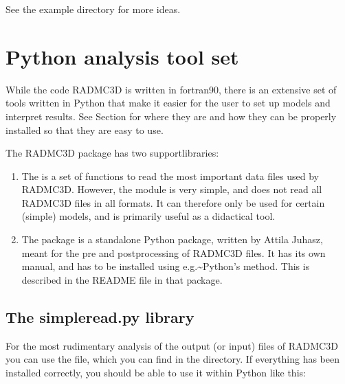 \documentclass[letterpaper,10pt,english]{sphinxmanual}
\begin{document}
See the example directory  for
more ideas.


\chapter{Python analysis tool set}
\label{\detokenize{pythontools:python-analysis-tool-set}}\label{\detokenize{pythontools:chap-python-analysis-tools}}\label{\detokenize{pythontools::doc}}
While the code RADMC\sphinxhyphen{}3D is written in fortran\sphinxhyphen{}90, there is an extensive set
of tools written in Python that make it easier for the user to set up models
and interpret results. See Section {\hyperref[\detokenize{installation:sec-install-pythonscripts}]{}} for where
they are and how they can be properly installed so that they are easy to
use.

The RADMC\sphinxhyphen{}3D package has two support\sphinxhyphen{}libraries:
\begin{enumerate}
%
\item {} 

The  is a set of functions to read the most
important data files used by RADMC\sphinxhyphen{}3D.  However, the  module
is very simple, and does not read all RADMC\sphinxhyphen{}3D files in all formats. It can
therefore only be used for certain (simple) models, and is primarily useful
as a didactical tool.

\item {} 

The  package is a stand\sphinxhyphen{}alone Python package, written by Attila
Juhasz, meant for the pre\sphinxhyphen{} and post\sphinxhyphen{}processing of RADMC\sphinxhyphen{}3D files.  It has its
own manual, and has to be installed using e.g.\textasciitilde{}Python’s 
method. This is described in the README file in that package.

\end{enumerate}


\section{The simpleread.py library}
\label{\detokenize{pythontools:the-simpleread-py-library}}
For the most rudimentary analysis of the output (or input) files of RADMC\sphinxhyphen{}3D you
can use the  file, which you can find in the 
directory. If everything has been installed correctly, you should be able to
use it within Python like this:
\end{document}
